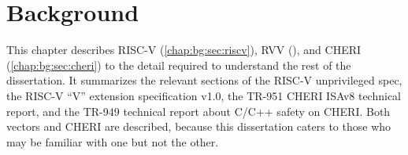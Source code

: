 \chapter{Background\label{chap:background}}

This chapter describes RISC-V (\cref{chap:bg:sec:riscv}), RVV (), and CHERI (\cref{chap:bg:sec:cheri}) to the detail required to understand the rest of the dissertation.
It summarizes the relevant sections of the RISC-V unprivileged spec, the RISC-V ``V'' extension specification v1.0, the TR-951 CHERI ISAv8 technical report, and the TR-949 technical report about C/C++ safety on CHERI.
Both vectors and CHERI are described, because this dissertation caters to those who may be familiar with one but not the other.


\pagebreak


\pagebreak

\pagebreak

\pagebreak

